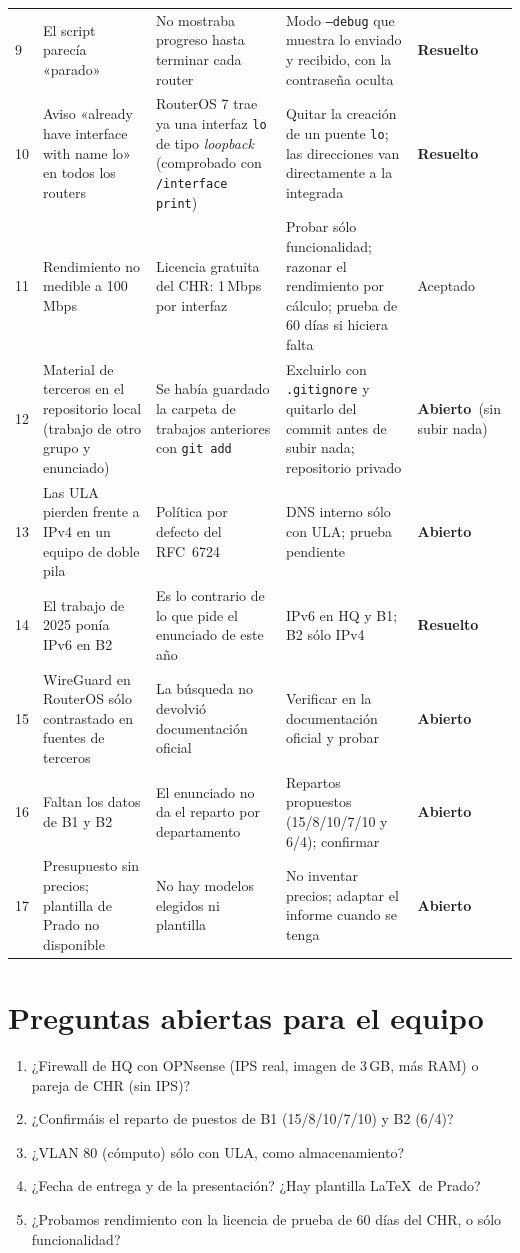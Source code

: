 \documentclass[11pt,a4paper]{article}
\newcommand{\cod}[1]{\texttt{#1}}
\newcommand{\hecho}{\textcolor{verde}{\textbf{Resuelto}}}
\newcommand{\abierto}{\textcolor{rojo}{\textbf{Abierto}}}
\begin{document}
\begin{longtable}{@{}p{0.5cm}p{4.3cm}p{4.2cm}p{5.4cm}p{1.6cm}@{}}
9 & El script parecía «parado» & No mostraba progreso hasta terminar cada router & Modo \cod{--debug} que muestra lo enviado y recibido, con la contraseña oculta & \hecho\\
10 & Aviso «already have interface with name lo» en todos los routers & RouterOS 7 trae ya una interfaz \cod{lo} de tipo \textit{loopback} (comprobado con \cod{/interface print}) & Quitar la creación de un puente \cod{lo}; las direcciones van directamente a la integrada & \hecho\\
11 & Rendimiento no medible a 100\,Mbps & Licencia gratuita del CHR: 1\,Mbps por interfaz & Probar sólo funcionalidad; razonar el rendimiento por cálculo; prueba de 60 días si hiciera falta & Aceptado\\
12 & Material de terceros en el repositorio local (trabajo de otro grupo y enunciado) & Se había guardado la carpeta de trabajos anteriores con \cod{git add} & Excluirlo con \cod{.gitignore} y quitarlo del commit antes de subir nada; repositorio privado & \abierto\ (sin subir nada)\\
13 & Las ULA pierden frente a IPv4 en un equipo de doble pila & Política por defecto del RFC~6724 & DNS interno sólo con ULA; prueba pendiente & \abierto\\
14 & El trabajo de 2025 ponía IPv6 en B2 & Es lo contrario de lo que pide el enunciado de este año & IPv6 en HQ y B1; B2 sólo IPv4 & \hecho\\
15 & WireGuard en RouterOS sólo contrastado en fuentes de terceros & La búsqueda no devolvió documentación oficial & Verificar en la documentación oficial y probar & \abierto\\
16 & Faltan los datos de B1 y B2 & El enunciado no da el reparto por departamento & Repartos propuestos (15/8/10/7/10 y 6/4); confirmar & \abierto\\
17 & Presupuesto sin precios; plantilla de Prado no disponible & No hay modelos elegidos ni plantilla & No inventar precios; adaptar el informe cuando se tenga & \abierto\\
\bottomrule
\end{longtable}
\endgroup

\section{Preguntas abiertas para el equipo}\label{sec:preg}
\begin{enumerate}
\item ¿Firewall de HQ con OPNsense (IPS real, imagen de 3\,GB, más RAM) o pareja de CHR (sin IPS)?
\item ¿Confirmáis el reparto de puestos de B1 (15/8/10/7/10) y B2 (6/4)?
\item ¿VLAN 80 (cómputo) sólo con ULA, como almacenamiento?
\item ¿Fecha de entrega y de la presentación? ¿Hay plantilla \LaTeX\ de Prado?
\item ¿Probamos rendimiento con la licencia de prueba de 60 días del CHR, o sólo funcionalidad?
\end{enumerate}
\end{document}
